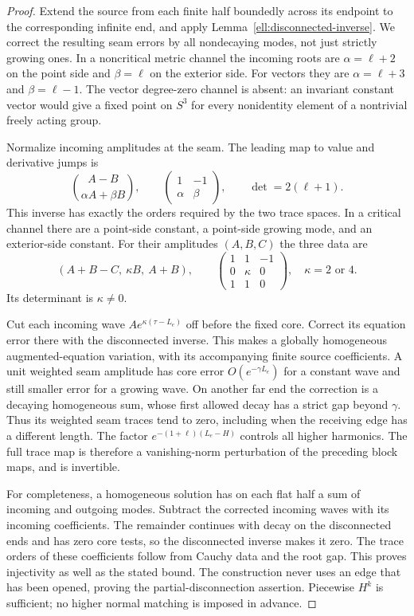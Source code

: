 \begin{proof}
Extend the source from each finite half boundedly across its
endpoint to the corresponding infinite end, and apply
Lemma~\ref{ell:disconnected-inverse}.  We correct the resulting
seam errors by all nondecaying modes, not just strictly growing
ones.  In a noncritical metric channel the incoming roots are
$\alpha=\ell+2$ on the point side and $\beta=\ell$ on the exterior
side.  For vectors they are $\alpha=\ell+3$ and $\beta=\ell-1$.
The vector degree-zero channel is absent: an invariant constant
vector would give a fixed point on $S^3$ for every nonidentity
element of a nontrivial freely acting group.

Normalize incoming amplitudes at the seam.  The leading map to
value and derivative jumps is
\[
 \binom{A-B}{\alpha A+\beta B},\qquad
 \begin{pmatrix}1&-1\\\alpha&\beta\end{pmatrix},
 \qquad \det=2(\ell+1).
\]
This inverse has exactly the orders required by the two trace
spaces.  In a critical channel there are a point-side constant,
a point-side growing mode, and an exterior-side constant.  For
their amplitudes $(A,B,C)$ the three data are
\begin{equation}
 (A+B-C,\ \kappa B,\ A+B),\qquad
 \begin{pmatrix}1&1&-1\\0&\kappa&0\\1&1&0\end{pmatrix},
 \quad \kappa=2\text{ or }4.
 \label{ell:critical-matrix}
\end{equation}
Its determinant is $\kappa\ne0$.

Cut each incoming wave $Ae^{\kappa(\tau-L_e)}$ off before the
fixed core.  Correct its equation error there with the disconnected
inverse.  This makes a globally homogeneous augmented-equation
variation, with its accompanying finite source coefficients.
A unit weighted seam amplitude has core error
$O(e^{-\gamma L_e})$ for a constant wave and still smaller error
for a growing wave.  On another far end the correction is a
decaying homogeneous sum, whose first allowed decay has a strict
gap beyond $\gamma$.  Thus its weighted seam traces tend to zero,
including when the receiving edge has a different length.  The
factor $e^{-(1+\ell)(L_e-H)}$ controls all higher harmonics.
The full trace map is therefore a vanishing-norm perturbation of
the preceding block maps, and is invertible.

For completeness, a homogeneous solution has on each flat half
a sum of incoming and outgoing modes.  Subtract the corrected
incoming waves with its incoming coefficients.  The remainder
continues with decay on the disconnected ends and has zero core
tests, so the disconnected inverse makes it zero.  The trace
orders of these coefficients follow from Cauchy data and the
root gap.  This proves injectivity as well as the stated bound.
The construction never uses an edge that has been opened, proving
the partial-disconnection assertion.  Piecewise $H^k$ is sufficient;
no higher normal matching is imposed in advance.
\end{proof}

